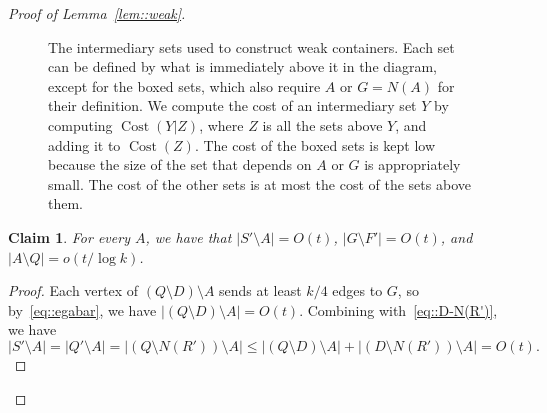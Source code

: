 \documentclass[12pt]{article}
\renewcommand{\bar}[1]{\overline{#1}}
\DeclareMathOperator{\cost}{Cost}
\newtheorem{claim}[theorem]{Claim}
\begin{document}
\begin{proof}[Proof of Lemma~\ref{lem::weak}]
\begin{figure}
\centering
{}
\caption{The intermediary sets used to construct weak containers. Each set can be defined by what is immediately above it in the diagram, except for the boxed sets, which also require $A$ or $G = N(A)$ for their definition. We compute the cost of an intermediary set $Y$ by computing $\cost(Y|Z)$, where $Z$ is all the sets above $Y$, and adding it to $\cost(Z)$. The cost of the boxed sets is kept low because the size of the set that depends on $A$ or $G$ is appropriately small. The cost of the other sets is at most the cost of the sets above them.}
\label{fig::weak}
\end{figure}

\begin{claim}\label{claim::A-Q}
For every $A$, we have that $|S' \setminus A| = O(t)$, $|G \setminus F'| = O(t)$, and $|A \setminus Q| = o(t/\log k)$.
\end{claim}

\begin{proof}
Each vertex of $(Q \setminus D) \setminus A$ sends at least $k/4$ edges to $G$, so by~\eqref{eq::egabar}, we have $|(Q \setminus D) \setminus A| = O(t)$. Combining with~\eqref{eq::D-N(R')}, we have
\[ |S' \setminus A| = |Q' \setminus A| = |(Q \setminus N(R')) \setminus A| \leq |(Q \setminus D) \setminus A| + |(D \setminus N(R')) \setminus A| = O(t) .\]


\end{proof}
\end{proof}
\end{document}
